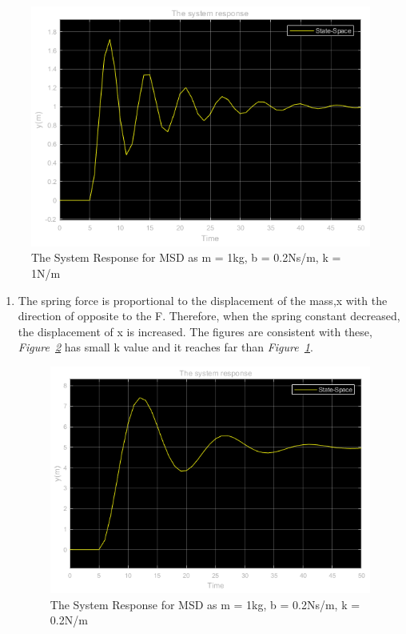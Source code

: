 \documentclass[a4paper,12pt]{article}
\begin{document}
\begin{enumerate}
\begin{enumerate}
				\begin{figure}[h]
					\center
					\setlength{\unitlength}{\textwidth} 
					\includegraphics[width=0.8\unitlength]{images/1cey}
					\caption{\label{fig:1c} The System Response for MSD as m = 1kg, b = 0.2Ns/m, k = 1N/m }
				\end{figure}
			
				\begin{enumerate}
					\item The spring force is proportional to the displacement of the mass,x with the direction of opposite to the F. Therefore, when the spring constant decreased, the displacement of x is increased. The figures are consistent with these, \textit{Figure~\ref{fig:1c1}} has small k value and it reaches far than \textit{Figure~\ref{fig:1c}}.		
			
			\begin{figure}[h]
				\center
				\setlength{\unitlength}{\textwidth} 
				\includegraphics[width=0.8\unitlength]{images/1c1ey}
				\caption{\label{fig:1c1} The System Response for MSD as m = 1kg, b = 0.2Ns/m, k = 0.2N/m }
			\end{figure}
			

\end{enumerate}
\end{enumerate}
\end{enumerate}
\end{document}
